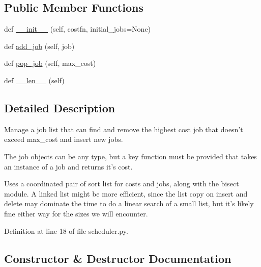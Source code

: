 \subsection*{Public Member Functions}
\begin{DoxyCompactItemize}
\item 
def \hyperlink{classcodar_1_1savanna_1_1scheduler_1_1_job_list_a692f67c81a57a97d01e899aa1f468435}{\+\_\+\+\_\+init\+\_\+\+\_\+} (self, costfn, initial\+\_\+jobs=None)
\item 
def \hyperlink{classcodar_1_1savanna_1_1scheduler_1_1_job_list_a235fcb4111e178e10fc7ab644bf9b531}{add\+\_\+job} (self, job)
\item 
def \hyperlink{classcodar_1_1savanna_1_1scheduler_1_1_job_list_a5aacbb616928bc7e9078ea08afe8d5ef}{pop\+\_\+job} (self, max\+\_\+cost)
\item 
def \hyperlink{classcodar_1_1savanna_1_1scheduler_1_1_job_list_a2ff2f963962e0c5cf5dac35c3cd37647}{\+\_\+\+\_\+len\+\_\+\+\_\+} (self)
\end{DoxyCompactItemize}


\subsection{Detailed Description}
\begin{DoxyVerb}Manage a job list that can find and remove the highest cost job that
doesn't exceed max_cost and insert new jobs.

The job objects can be any type, but a key function must be provided
that takes an instance of a job and returns it's cost.

Uses a coordinated pair of sort list for costs and jobs, along with
the bisect module. A linked list might be more efficient, since the
list copy on insert and delete may dominate the time to do a linear
search of a small list, but it's likely fine either way for the
sizes we will encounter.\end{DoxyVerb}
 

Definition at line 18 of file scheduler.\+py.



\subsection{Constructor \& Destructor Documentation}
\mbox{\label{classcodar_1_1savanna_1_1scheduler_1_1_job_list_a692f67c81a57a97d01e899aa1f468435}} 
